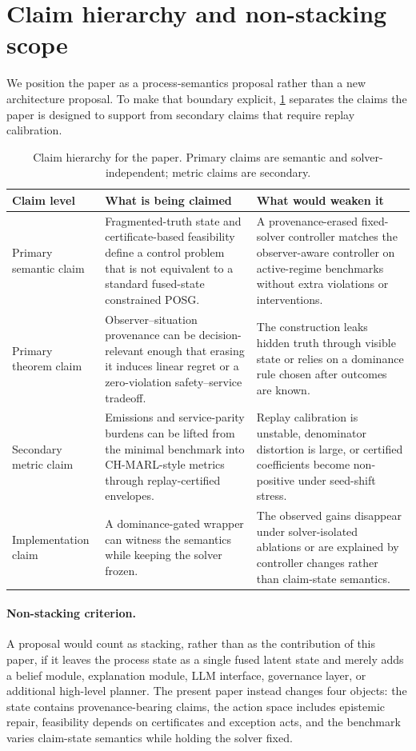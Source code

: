 \documentclass[11pt]{article}
\newcommand{\1}{\mathbf{1}}
\theoremstyle{definition}
\theoremstyle{plain}
\theoremstyle{remark}
\begin{document}
\section{Claim hierarchy and non-stacking scope}
\label{sec:claim-hierarchy}

We position the paper as a process-semantics proposal rather than a new architecture proposal. To make that boundary explicit, \cref{tab:claim-hierarchy} separates the claims the paper is designed to support from secondary claims that require replay calibration.

\begin{table}[H]
\centering
\caption{Claim hierarchy for the paper. Primary claims are semantic and solver-independent; metric claims are secondary.}
\label{tab:claim-hierarchy}
\small
\begin{tabularx}{\textwidth}{@{}p{}XX@{}}
\toprule
Claim level & What is being claimed & What would weaken it \\
\midrule
Primary semantic claim & Fragmented-truth state and certificate-based feasibility define a control problem that is not equivalent to a standard fused-state constrained POSG. & A provenance-erased fixed-solver controller matches the observer-aware controller on active-regime benchmarks without extra violations or interventions. \\
Primary theorem claim & Observer--situation provenance can be decision-relevant enough that erasing it induces linear regret or a zero-violation safety--service tradeoff. & The construction leaks hidden truth through visible state or relies on a dominance rule chosen after outcomes are known. \\
Secondary metric claim & Emissions and service-parity burdens can be lifted from the minimal benchmark into CH-MARL-style metrics through replay-certified envelopes. & Replay calibration is unstable, denominator distortion is large, or certified coefficients become non-positive under seed-shift stress. \\
Implementation claim & A dominance-gated wrapper can witness the semantics while keeping the solver frozen. & The observed gains disappear under solver-isolated ablations or are explained by controller changes rather than claim-state semantics. \\
\bottomrule
\end{tabularx}
\end{table}

\paragraph{Non-stacking criterion.}
A proposal would count as stacking, rather than as the contribution of this paper, if it leaves the process state as a single fused latent state and merely adds a belief module, explanation module, LLM interface, governance layer, or additional high-level planner. The present paper instead changes four objects: the state contains provenance-bearing claims, the action space includes epistemic repair, feasibility depends on certificates and exception acts, and the benchmark varies claim-state semantics while holding the solver fixed.
\end{document}
